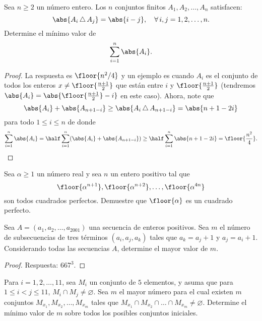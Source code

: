\begin{probMG}
  Sea $n\ge 2$ un número entero. Los $n$ conjuntos finitos $A_1,A_2,\dots,A_n$
  satisfacen:
  \[\abs{A_i\,\triangle\,A_j}=\abs{i-j},\quad\forall\,i,j=1,2,\dots,n.\]
  Determine el mínimo valor de
  \[\sum_{i=1}^n\abs{A_i}.\]
\end{probMG}

\begin{proof}
  La respuesta es $\floor{n^2/4}$ y un ejemplo es cuando $A_i$ es el conjunto de
  todos los enteros $x\ne\floor{\frac{n+1}{2}}$ que están entre $i$ y
  $\floor{\frac{n+1}{2}}$ (tendremos $\abs{A_i}=\abs{\floor{\frac{n+1}{2}}-i}$
  en este caso). Ahora, note que
  \[\abs{A_i}+\abs{A_{n+1-i}}\ge\abs{A_i\,\triangle\,A_{n+1-i}}=\abs{n+1-2i}\]
  para todo $1\le i\le n$ de donde
  \[
    \sum_{i=1}^n\abs{A_i}
    =\half\sum_{i=1}^n(\abs{A_i}+\abs{A_{n+1-i}})
    \ge\half\sum_{i=1}^n\abs{n+1-2i}
    =\floor{\frac{n^2}{4}}.
  \]
\end{proof}

\begin{problem}
  Sea $\alpha\ge 1$ un número real y sea $n$ un entero positivo tal que
  \[\floor{\alpha^{n+1}},\floor{\alpha^{n+2}},\dots,\floor{\alpha^{4n}}\]
  son todos cuadrados perfectos. Demuestre que $\floor{\alpha}$ es un cuadrado
  perfecto.
\end{problem}


\begin{probEG}
  Sea $A=(a_1,a_2,\dots,a_{2001})$ una secuencia de enteros positivos. Sea $m$
  el número de subsecuencias de tres términos $(a_i,a_j,a_k)$ tales que
  $a_k=a_j+1$ y $a_j=a_i+1$. Considerando todas las secuencias $A$, determine el
  mayor valor de $m$.
\end{probEG}

\begin{proof}
  Respuesta: $667^3$.
\end{proof}

\begin{probEG}
  Para $i=1,2,\dots,11$, sea $M_i$ un conjunto de $5$ elementos, y asuma que
  para $1\le i<j\le 11$, $M_i\cap M_j\ne\varnothing$. Sea $m$ el mayor número
  para el cual existen $m$ conjuntos $M_{x_1},M_{x_2},\dots,M_{x_m}$ tales que
  $M_{x_1}\cap M_{x_2}\cap\dots\cap M_{x_m}\ne\varnothing$. Determine el mínimo
  valor de $m$ sobre todos los posibles conjuntos iniciales.
\end{probEG}

